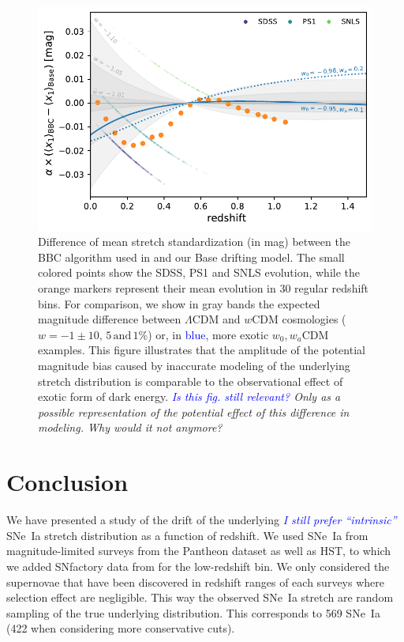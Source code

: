 \documentclass[]{aa} %
\newcommand{\nn}[1]{{\textcolor[rgb]{1, 0.27, 0}{#1}}}
\newcommand{\yc}[1]{{\textcolor{blue}{#1}}}
\begin{document}
\begin{figure}
    \centering
    \includegraphics[width=\linewidth]{Article_figures/BBC_distmod_w0wa.pdf}
    \caption{Difference of mean stretch standardization (in mag) between the BBC
        algorithm used in \cite{scolnic2018a} and our Base drifting model.
        \nn{The small colored points show the SDSS, PS1 and SNLS evolution,
            while the orange markers represent their mean evolution in 30
            regular redshift bins.} For comparison, we show in gray bands the
            expected magnitude difference between $\Lambda$CDM and $w$CDM
            cosmologies ($w=-1\pm 10,\,5\,\mathrm{and}\,1\%$) or, in \yc{blue},
            more exotic $w_0,w_a$CDM examples. This figure illustrates that the
            amplitude of the potential magnitude bias caused by inaccurate
        modeling of the underlying stretch distribution is comparable to the
    observational effect of exotic form of dark energy. \textit{\yc{Is this fig. still relevant?} \nn{Only as a possible representation of the potential effect of this
    difference in modeling. Why would it not anymore?}}}
    \label{fig:magdrift}
\end{figure}

\section{Conclusion}
\label{sec:ccl}

We have presented a study of the drift of the underlying \textit{\yc{I still prefer ``intrinsic''}} SNe~Ia stretch
distribution as a function of redshift. We used SNe~Ia from magnitude-limited
surveys from the Pantheon dataset \citep[][SDSS, PS1 and SNLS]{scolnic2018a} as
well as HST, to which we added SNfactory data from \cite{rigault2018} for the
low-redshift bin. We only considered the supernovae that have been discovered
in redshift ranges of each surveys where selection effect are negligible. This
way the observed SNe~Ia stretch are random sampling of the true underlying
distribution. This corresponds to 569 SNe~Ia (422 when considering more
conservative cuts).
\end{document}
